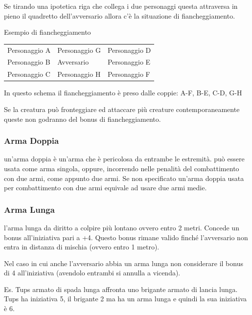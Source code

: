 \documentclass[a4paper,11pt,twoside,openany]{book}
\begin{document}
Se tirando una ipotetica riga che collega i due personaggi questa attraversa in pieno il quadretto dell'avversario allora c'è la situazione di fiancheggiamento.

\bigskip

Esempio di fiancheggiamento

\medskip

\begin{tabularx}{0.95\textwidth}{XXX}
	\toprule
	Personaggio A & Personaggio G & Personaggio D\\
	Personaggio B & Avversario    & Personaggio E\\
	Personaggio C & Personaggio H & Personaggio F\\
\end{tabularx}

\bigskip

In questo schema il fiancheggiamento è preso dalle coppie: A-F, B-E, C-D, G-H

\bigskip

Se la creatura può fronteggiare ed attaccare più creature contemporaneamente queste non godranno del bonus di fiancheggiamento.

\subsubsection{Arma Doppia} un'arma doppia è un'arma che è pericolosa da entrambe le estremità. può essere usata come arma singola, oppure, incorrendo nelle penalità del combattimento con due armi, come appunto due armi. Se non specificato un'arma doppia usata per combattimento con due armi equivale ad usare due armi medie.

\subsubsection{Arma Lunga} l'arma lunga da diritto a colpire più lontano ovvero entro 2 metri. Concede un bonus all'iniziativa pari a +4. Questo bonus rimane valido finché l'avversario non entra in distanza di mischia (ovvero entro 1 metro).

Nel caso in cui anche l'avversario abbia un arma lunga non considerare il bonus di 4 all'iniziativa (avendolo entrambi si annulla a vicenda).

Es. Tups armato di spada lunga affronta uno brigante armato di lancia lunga. Tups ha iniziativa 5, il brigante 2 ma ha un arma lunga e quindi la sua iniziativa è 6.
\end{document}
